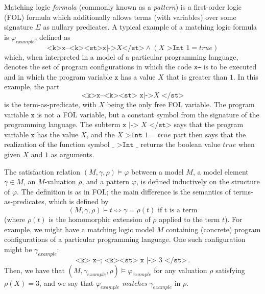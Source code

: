 Matching logic \emph{formula} (commonly known as a \emph{pattern}) is a
first-order logic (FOL) formula which additionally allows terms (with variables)
over some signature $\Sigma$ as nullary predicates.
A typical example of a matching logic formula is $\varphi_{\mathit{example}}$, defined as
\begin{equation}\label{eqn:exampleMLPattern}
\texttt{<k>x--<k><st>x} \texttt{|->} X\texttt{</st>} \land (X \texttt{ >Int } 1 = \mathit{true})
\end{equation}
which, when interpreted in a model of a particular programming language,
denotes the set of program configurations in which the code \texttt{x--} is to be executed
and in which the program variable $\texttt{x}$ has a value $X$ that is greater than $1$.
In this example, the part
\begin{equation*}
    \texttt{<k>x--<k><st> x} \texttt{|->} X\texttt{ </st>}
\end{equation*}
is the term-as-predicate, with $X$ being the only free FOL variable.
The program variable $\texttt{x}$ is not a FOL variable, but a constant symbol from the signature of the programming language.
The subterm $\texttt{x} \texttt{ |-> } X\texttt{ </st>}$ says that the program variable $\texttt{x}$
has the value $X$, and the $X \texttt{ >Int } 1 = \mathit{true}$ part then says that the realization
of the function symbol $\_ \texttt{ >Int } \_$ returns the boolean value $\mathit{true}$ when given $X$ and $1$
as arguments.

The satisfaction relation $(M, \gamma, \rho) \vDash \varphi$ between a model $M$, a model element $\gamma \in M$,
an $M$-valuation $\rho$, and a pattern $\varphi$, is defined inductively on the structure of $\varphi$.
The definition is as in FOL; the main difference is the semantics of terms-as-predicates, which is defined by
\begin{equation*}
    (M, \gamma, \rho) \vDash t \iff \gamma = \rho(t) \text{ if t is a term}
\end{equation*}
(where $\rho(t)$ is the homomorphic extension of $\rho$ applied to the term $t$).
For example, we might have a matching logic model $M$ containing (concrete) program configurations
of a particular programming language.
One such configuration might be $\gamma_{\mathit{example}}$:
\begin{equation*}
    \texttt{<k> x--; <k><st> x} \texttt{ |-> } 3\texttt{ </st>} \, .
\end{equation*}
Then, we have that $(M, \gamma_{\mathit{example}}, \rho) \vDash \varphi_{\mathit{example}}$
for any valuation $\rho$ satisfying $\rho(X) = 3$, and we say that
$\varphi_{\mathit{example}}$ \emph{matches} $\gamma_{\mathit{example}}$ in $\rho$.


